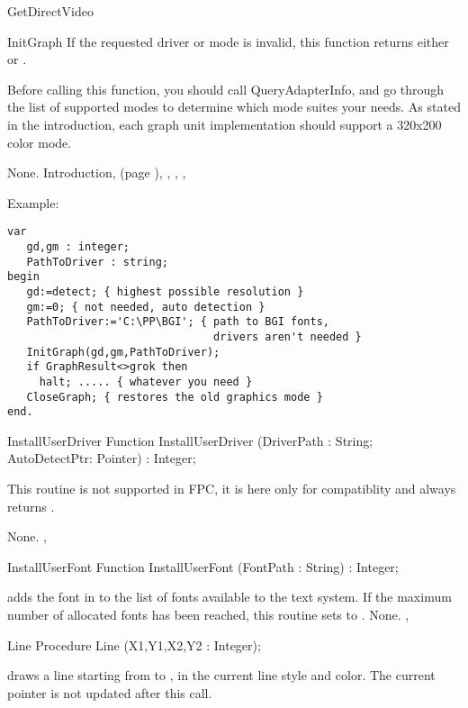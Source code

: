 \begin{function}{GetDirectVideo}
\begin{procedure}{InitGraph}
If the requested driver or mode is invalid, this function returns either
 or .

Before calling this function, you should call QueryAdapterInfo, and
go through the list of supported modes to determine which mode suites
your needs. As stated in the introduction, each graph unit implementation
should support a 320x200 color mode.

\Errors
None.
\SeeAlso
Introduction, (page \pageref{se:Introduction}),
, , ,
\end{procedure}
Example:
\begin{verbatim}
var
   gd,gm : integer;
   PathToDriver : string;
begin
   gd:=detect; { highest possible resolution }
   gm:=0; { not needed, auto detection }
   PathToDriver:='C:\PP\BGI'; { path to BGI fonts,
                                drivers aren't needed }
   InitGraph(gd,gm,PathToDriver);
   if GraphResult<>grok then
     halt; ..... { whatever you need }
   CloseGraph; { restores the old graphics mode }
end.
\end{verbatim}

\begin{function}{InstallUserDriver}
\Declaration
Function InstallUserDriver (DriverPath : String; AutoDetectPtr: Pointer) : Integer;

\Description
This routine is not supported in FPC, it is here only for compatiblity and
always returns .

\Errors
None.
\SeeAlso
{}, 
\end{function}
\begin{function}{InstallUserFont}
\Declaration
Function InstallUserFont (FontPath : String) : Integer;

\Description
{} adds the font in  to the list of fonts
available to the text system. If the maximum number of allocated fonts has
been reached, this routine sets  to .
\Errors
None.
\SeeAlso
{}, 
\end{function}
\begin{procedure}{Line}
\Declaration
Procedure Line (X1,Y1,X2,Y2 : Integer);

\Description
{} draws a line starting from
 to , in the current line style and color.
The current pointer is not updated after this call.


\end{procedure}
\end{function}
